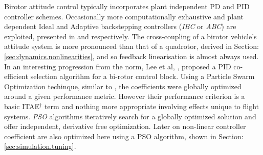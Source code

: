 Birotor attitude control typically incorporates plant independent PD \cite{obliquepitch} and PID \cite{tiltrotorUAV} controller schemes. Occasionally more computationally exhaustive and plant dependent Ideal and Adaptive backstepping controllers (\emph{IBC} or \emph{ABC}) are exploited, presented in \cite{smalltwotilting,tpheonix} and \cite{adaptivebackstep} respectively. The cross-coupling of a birotor vehicle's attitude system is more pronounced than that of a quadrotor, derived in Section:\ref{sec:dynamics.nonlinearities}, and so feedback linearisation is almost always used. In an interesting progression from the norm, Lee et al,  \cite{autopilotPSO}, proposed a PID co-efficient selection algorithm for a bi-rotor control block. Using a Particle Swarm Optimization techinque, similar to \cite{adaptivepso}, the coefficients were globally optimized around a given performance metric. However their performance criterion is a basic ITAE$^\dagger$ term and nothing more appropriate involving effects unique to flight systems. \emph{PSO} algorithms iteratively search for a globally optimized solution and offer independent, derivative free optimization. Later on non-linear controller coefficient are also optimized here using a PSO algorithm, shown in Section:\ref{sec:simulation.tuning}.
\par
